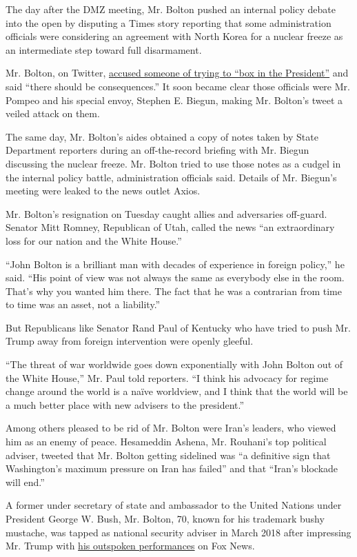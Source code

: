 The day after the DMZ meeting, Mr. Bolton pushed an internal policy
debate into the open by disputing a Times story reporting that some
administration officials were considering an agreement with North Korea
for a nuclear freeze as an intermediate step toward full disarmament.

Mr. Bolton, on Twitter,
\href{https://twitter.com/AmbJohnBolton/status/1145646367865528320?s=20}{accused
someone of trying to ``box in the President''} and said ``there should
be consequences.'' It soon became clear those officials were Mr. Pompeo
and his special envoy, Stephen E. Biegun, making Mr. Bolton's tweet a
veiled attack on them.

The same day, Mr. Bolton's aides obtained a copy of notes taken by State
Department reporters during an off-the-record briefing with Mr. Biegun
discussing the nuclear freeze. Mr. Bolton tried to use those notes as a
cudgel in the internal policy battle, administration officials said.
Details of Mr. Biegun's meeting were leaked to the news outlet Axios.

Mr. Bolton's resignation on Tuesday caught allies and adversaries
off-guard. Senator Mitt Romney, Republican of Utah, called the news ``an
extraordinary loss for our nation and the White House.''

``John Bolton is a brilliant man with decades of experience in foreign
policy,'' he said. ``His point of view was not always the same as
everybody else in the room. That's why you wanted him there. The fact
that he was a contrarian from time to time was an asset, not a
liability.''

But Republicans like Senator Rand Paul of Kentucky who have tried to
push Mr. Trump away from foreign intervention were openly gleeful.

``The threat of war worldwide goes down exponentially with John Bolton
out of the White House,'' Mr. Paul told reporters. ``I think his
advocacy for regime change around the world is a naïve worldview, and I
think that the world will be a much better place with new advisers to
the president.''

Among others pleased to be rid of Mr. Bolton were Iran's leaders, who
viewed him as an enemy of peace. Hesameddin Ashena, Mr. Rouhani's top
political adviser, tweeted that Mr. Bolton getting sidelined was ``a
definitive sign that Washington's maximum pressure on Iran has failed''
and that ``Iran's blockade will end.''

A former under secretary of state and ambassador to the United Nations
under President George W. Bush, Mr. Bolton, 70, known for his trademark
bushy mustache, was tapped as national security adviser in March 2018
after impressing Mr. Trump with
\href{https://www.nytimes3xbfgragh.onion/2018/04/08/us/politics/john-bolton-trump.html}{his
outspoken performances} on Fox News.

